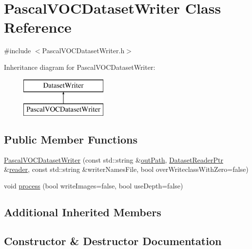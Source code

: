 \hypertarget{class_pascal_v_o_c_dataset_writer}{}\section{Pascal\+V\+O\+C\+Dataset\+Writer Class Reference}
\label{class_pascal_v_o_c_dataset_writer}


{\ttfamily \#include $<$Pascal\+V\+O\+C\+Dataset\+Writer.\+h$>$}

Inheritance diagram for Pascal\+V\+O\+C\+Dataset\+Writer\+:\begin{figure}[H]
\begin{center}
\leavevmode
\includegraphics[height=2.000000cm]{class_pascal_v_o_c_dataset_writer}
\end{center}
\end{figure}
\subsection*{Public Member Functions}
\begin{DoxyCompactItemize}
\item 
\hyperlink{class_pascal_v_o_c_dataset_writer_af6fb8a8d61b6b9fced7415d2de4becc0}{Pascal\+V\+O\+C\+Dataset\+Writer} (const std\+::string \&\hyperlink{class_dataset_writer_ac19eabc3e69f6e9bc4c5185803eed626}{out\+Path}, \hyperlink{_dataset_reader_8h_a30d89cba514a220d64d04535c0465f1c}{Dataset\+Reader\+Ptr} \&\hyperlink{class_dataset_writer_a2edef70c0de507a2e056eb3984705811}{reader}, const std\+::string \&writer\+Names\+File, bool over\+Writeclass\+With\+Zero=false)
\item 
void \hyperlink{class_pascal_v_o_c_dataset_writer_a93b4aa44b217491ddf99348b2517e6ea}{process} (bool write\+Images=false, bool use\+Depth=false)
\end{DoxyCompactItemize}
\subsection*{Additional Inherited Members}


\subsection{Constructor \& Destructor Documentation}
\mbox{\label{class_pascal_v_o_c_dataset_writer_af6fb8a8d61b6b9fced7415d2de4becc0}} 
